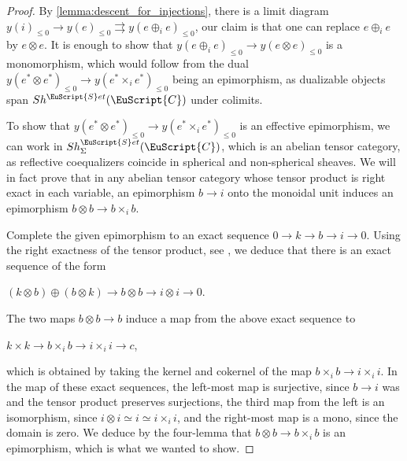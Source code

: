 \documentclass[oneside,a4paper]{amsart}
\newcommand{\euscr}[1]{\EuScript{#1}} %
\newcommand{\ccat}{\euscr{C}} %
\newcommand{\sets}{\euscr{S}et} %
\theoremstyle{plain}
\theoremstyle{definition}
\theoremstyle{remark}
\begin{document}
\begin{proof}
By \cref{lemma:descent_for_injections}, there is a limit diagram $y(i)_{\leq 0} \rightarrow y(e) _{\leq 0} \rightrightarrows y(e \oplus _{i} e) _{\leq 0}$, our claim is that one can replace $e \oplus _{i} e$ by $e \otimes e$. It is enough to show that $y(e \oplus_{i} e)_{\leq 0} \rightarrow y(e \otimes e)_{\leq 0}$ is a monomorphism, which would follow from the dual $y(e^{*} \otimes e^{*})_{\leq 0} \rightarrow y(e^{*} \times_{i} e^{*})_{\leq 0}$ being an epimorphism, as dualizable objects span $Sh^{\sets}(\ccat)$ under colimits. 

To show that $y(e^{*} \otimes e^{*})_{\leq 0} \rightarrow y(e^{*} \times_{i} e^{*})_{\leq 0}$ is an effective epimorphism, we can work in $Sh^{\sets}_{\Sigma}(\ccat)$, which is an abelian tensor category, as reflective coequalizers coincide in spherical and non-spherical sheaves. We will in fact prove that in any abelian tensor category whose tensor product is right exact in each variable, an epimorphism $b \rightarrow i$ onto the monoidal unit induces an epimorphism $b \otimes b \rightarrow b \times _{i} b$. 

Complete the given epimorphism to an exact sequence $0 \rightarrow k \rightarrow b \rightarrow i \rightarrow 0$. Using the right exactness of the tensor product, see \cite[3.1.20]{brandenburg2014tensor}, we deduce that there is an exact sequence of the form 

\begin{center} 
$(k \otimes b) \oplus (b \otimes k) \rightarrow b \otimes b \rightarrow i \otimes i \rightarrow 0$. 
\end{center}
The two maps $b \otimes b \rightarrow b$ induce a map from the above exact sequence to

\begin{center}
$k \times k \rightarrow b \times _{i} b \rightarrow i \times_{i} i \rightarrow c$, 
\end{center}
which is obtained by taking the kernel and cokernel of the map $b \times _{i} b \rightarrow i \times _{i} i$. In the map of these exact sequences, the left-most map is surjective, since $b \rightarrow i$ was and the tensor product preserves surjections, the third map from the left is an isomorphism, since $i \otimes i \simeq i \simeq i \times _{i} i$, and the right-most map is a mono, since the domain is zero. We deduce by the four-lemma that $b \otimes b \rightarrow b \times _{i} b$ is an epimorphism, which is what we wanted to show. 
\end{proof}
\end{document}
